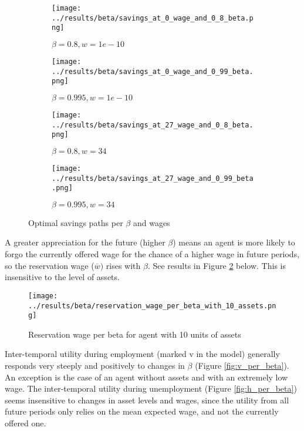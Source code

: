 \documentclass[12pt]{article}
\begin{document}
\begin{figure}[hbt!]

\begin{subfigure}{0.5\textwidth}
\texttt{[image: ../results/beta/savings\_at\_0\_wage\_and\_0\_8\_beta.png]}
\caption{$\beta=0.8, w=1e-10$}
\end{subfigure}%
\begin{subfigure}{0.5\textwidth}
\texttt{[image: ../results/beta/savings\_at\_0\_wage\_and\_0\_99\_beta.png]}
\caption{$\beta=0.995, w=1e-10$}
\end{subfigure}

\begin{subfigure}{0.5\textwidth}
\texttt{[image: ../results/beta/savings\_at\_27\_wage\_and\_0\_8\_beta.png]}
\caption{$\beta=0.8, w=34$}
\end{subfigure}%
\begin{subfigure}{0.5\textwidth}
\texttt{[image: ../results/beta/savings\_at\_27\_wage\_and\_0\_99\_beta.png]}
\caption{$\beta=0.995, w=34$}
\end{subfigure}

\caption{Optimal savings paths per $\beta$ and wages}
\label{fig:savings_per_beta}
\end{figure}

\vspace{5mm}
A greater appreciation for the future (higher $\beta$) means an agent is more likely to forgo the currently offered wage for the chance of a higher wage in future periods, so the reservation wage ($\overline{w})$ rises with $\beta$. See results in Figure \ref{fig:reservation_wage_per_beta} below. This is insensitive to the level of assets.

\begin{figure}[hbt!]
\centering
\texttt{[image: ../results/beta/reservation\_wage\_per\_beta\_with\_10\_assets.png]}
\caption{Reservation wage per beta for agent with 10 units of assets}
\label{fig:reservation_wage_per_beta}
\end{figure}

\vspace{5mm}
Inter-temporal utility during employment (marked v in the model) generally responds very steeply and positively to changes in $\beta$ (Figure \ref{fig:v_per_beta}). An exception is the case of an agent without assets and with an extremely low wage. The inter-temporal utility during unemployment (Figure \ref{fig:h_per_beta}) seems insensitive to changes in asset levels and wages, since the utility from all future periods only relies on the mean expected wage, and not the currently offered one.
\end{document}
